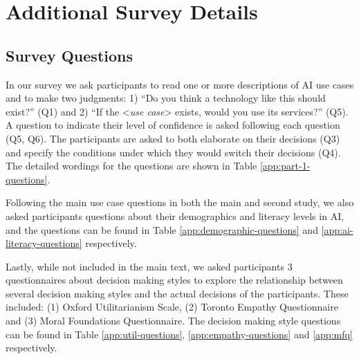 \appendix

\section{Additional Survey Details}
\label{app:survey-details}

\subsection{Survey Questions}\label{sssec:a-questions}
In our survey we ask participants to read one or more descriptions of AI use cases and to make two judgments: 1) ``Do you think a technology like this should exist?'' (Q1) and 2) ``If the <\textit{use case}> exists, would you use its services?'' (Q5). A question to indicate their level of confidence is asked following each question (Q5, Q6). The participants are asked to both elaborate on their decisions (Q3) and specify the conditions under which they would switch their decisions (Q4). The detailed wordings for the questions are shown in Table \ref{app:part-1-questions}.

Following the main use case questions in both the main and second study, we also asked participants questions about their demographics and literacy levels in AI, and the questions can be found in Table \ref{app:demographic-questions} and \ref{app:ai-literacy-questions} respectively. 

Lastly, while not included in the main text, we asked participants 3 questionnaires about decision making styles to explore the relationship between several decision making styles and the actual decisions of the participants. These included: (1) Oxford Utilitarianism Scale, (2) Toronto Empathy Questionnaire and (3) Moral Foundations Questionnaire. The decision making style questions can be found in Table \ref{app:util-questions}, \ref{app:empathy-questions} and \ref{app:mfq} respectively.








